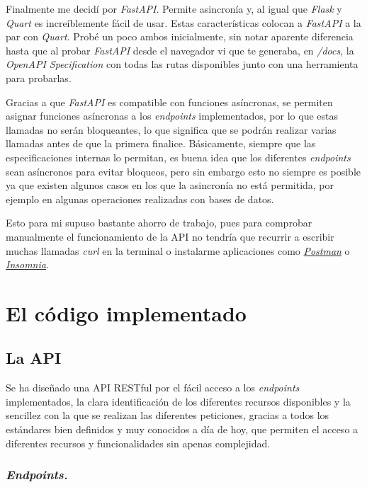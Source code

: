 Finalmente me decidí por \textit{FastAPI}. Permite asincronía y, al igual que \textit{Flask} y \textit{Quart} es increíblemente fácil de usar. Estas características colocan a \textit{FastAPI} a la par con \textit{Quart}. Probé un poco ambos inicialmente, sin notar aparente diferencia hasta que al probar \textit{FastAPI} desde el navegador vi que te generaba, en \textit{/docs}, la \textit{OpenAPI Specification} con todas las rutas disponibles junto con una herramienta para probarlas.

Gracias a que \textit{FastAPI} es compatible con funciones asíncronas, se permiten asignar funciones asíncronas a los \textit{endpoints} implementados, por lo que estas llamadas no serán bloqueantes, lo que significa que se podrán realizar varias llamadas antes de que la primera finalice. Básicamente, siempre que las especificaciones internas lo permitan, es buena idea que los diferentes \textit{endpoints} sean asíncronos para evitar bloqueos, pero sin embargo esto no siempre es posible ya que existen algunos casos en los que la asincronía no está permitida, por ejemplo en algunas operaciones realizadas con bases de datos.

Esto para mi supuso bastante ahorro de trabajo, pues para comprobar manualmente el funcionamiento de la API no tendría que recurrir a escribir muchas llamadas \textit{curl} en la terminal o instalarme aplicaciones como \href{https://www.postman.com/}{\textit{Postman}} o \href{https://insomnia.rest/}{\textit{Insomnia}}.

\section{El código implementado}

\subsection{La API}
\label{api}

Se ha diseñado una API RESTful por el fácil acceso a los \textit{endpoints} implementados, la clara identificación de los diferentes recursos disponibles y la sencillez con la que se realizan las diferentes peticiones, gracias a todos los estándares bien definidos y muy conocidos a día de hoy, que permiten el acceso a diferentes recursos y funcionalidades sin apenas complejidad.

\subsubsection{\textit{Endpoints.}}

